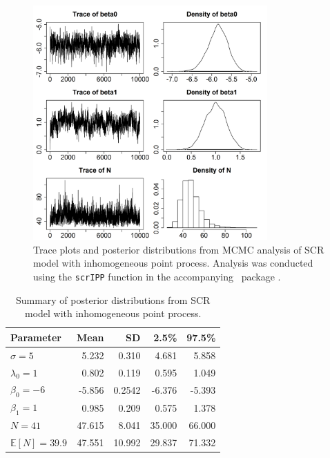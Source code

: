 \begin{figure}
  \centering
  \includegraphics[width=0.8\textwidth]{Ch11/figs/fm1p}
  \caption{Trace plots and posterior distributions from MCMC analysis
    of SCR model with inhomogeneous point process. Analysis was
    conducted using the \texttt{scrIPP} function in the accompanying
    \R~package \scrbook.}
  \label{fig:state-space.fig.fm1post}
\end{figure}

\begin{table}%
\centering
\caption{Summary of posterior distributions from SCR model with
  inhomogeneous point process. }
\begin{tabular}{lrrrr}
\hline
Parameter 	 	& Mean  	& SD    	& 2.5\% 	& 97.5\% \\
\hline
 $\sigma=5$ 	 	&  5.232 	&  0.310 	&  4.681 	&  5.858 \\
 $\lambda_0=1$ 	 	&  0.802 	&  0.119 	&  0.595 	&  1.049 \\
 $\beta_0=-6$ 	 	& -5.856        & 0.2542        & -6.376        & -5.393 \\
 $\beta_1=1$ 	 	&  0.985 	&  0.209 	&  0.575 	&  1.378 \\
 $N=41$ 	 	& 47.615 	&  8.041 	& 35.000 	& 66.000 \\
 $\mathbb{E}[N]=39.9$ 	& 47.551 	& 10.992 	& 29.837 	& 71.332 \\
\hline
\end{tabular}
\label{state-space.tab.simIPP}
\end{table}

